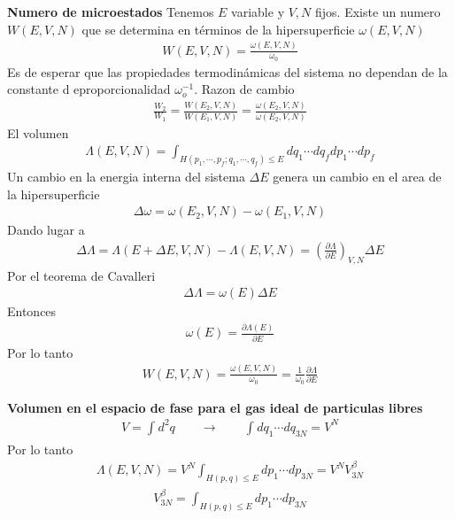 \documentclass{article}
\begin{document}
\textbf{Numero de microestados} Tenemos $ E  $ variable y $ V,N  $ fijos. Existe un numero $ W(E,V,N) $ que se determina en términos de la hipersuperficie $ \omega(E,V,N ) $
\begin{gather*}
   W(E,V,N) = \frac{\omega(E,V,N)}{\omega_0}
\end{gather*}
Es de esperar que las propiedades termodinámicas del sistema no dependan de la constante d eproporcionalidad $ \omega_o ^ {-1 } $. Razon de cambio 
\begin{gather*}
  \frac{W_2 }{W_1 } =  \frac{W (E_2,V,N)}{W (E_1,V,N)} = \frac{\omega(E_2,V,N)}{\omega(E_2,V,N  )}
\end{gather*}
El volumen 
\begin{gather*}
  \Lambda(E,V,N) = \displaystyle\int_{H(p_1, \cdots, p_f;q_1, \cdots, q_f)\leq E }^{}dq_1\cdots dq_f dp_1 \cdots dp_f
\end{gather*}
Un cambio en la energia interna del sistema $ \Delta E  $ genera un cambio en el area de la hipersuperficie 
\begin{gather*}
  \Delta\omega = \omega(E_2,V,N) - \omega(E_1,V,N) 
\end{gather*}
Dando lugar a 
\begin{gather*}
  \Delta\Lambda = \Lambda(E + \Delta E, V,N ) - \Lambda (E,V,N ) = \left(\frac{\partial \Lambda }{\partial E }\right) _{V,N } \Delta E 
\end{gather*}
Por el teorema de Cavalleri 
\begin{gather*}
  \Delta\Lambda = \omega(E) \Delta E 
\end{gather*}
Entonces 
\begin{gather*}
  \omega(E) = \frac{\partial \Lambda(E)  }{\partial E}  
\end{gather*}
Por lo tanto 
\begin{gather*}
  W(E,V,N) = \frac{\omega(E,V,N )}{\omega_0 } = \frac{1}{\omega_0 } \frac{\partial \Lambda }{\partial E } 
\end{gather*}

\textbf{Volumen en el espacio de fase para el gas ideal de particulas libres }
\begin{gather*}
  V = \int_{}^{} d^2 q \qquad \rightarrow \qquad \int_{}^{}dq_1 \cdots dq _{3N }  = V ^ {N } 
\end{gather*}
Por lo tanto 
\begin{gather*}
  \Lambda (E,V,N)=V^N \int_{H(p,q) \leq E }^{} dp_1 \cdots dp _{3N } = V^N V ^ {\beta} _{3N }  
\end{gather*}
\begin{gather*}
  V ^ {\beta } _{3N }  = \int_{H(p,q) \leq E }^{} dp_1 \cdots dp _{3N }  
\end{gather*}
\end{document}
